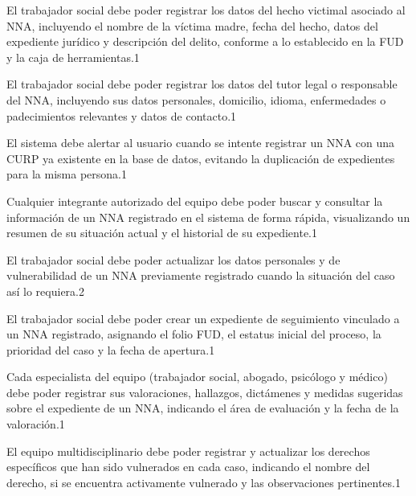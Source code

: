 \begin{requerimientosU}
	{El trabajador social debe poder registrar los datos del hecho 
		victimal asociado al NNA, incluyendo el nombre de la víctima madre, 
		fecha del hecho, datos del expediente jurídico y descripción del 
		delito, conforme a lo establecido en la FUD y la caja de 
		herramientas.}{1}{\DONE}
	
	{El trabajador social debe poder registrar los datos del tutor legal 
		o responsable del NNA, incluyendo sus datos personales, domicilio, 
		idioma, enfermedades o padecimientos relevantes y datos de 
		contacto.}{1}{\DONE}
	
	{El sistema debe alertar al usuario cuando se intente registrar un 
		NNA con una CURP ya existente en la base de datos, evitando la 
		duplicación de expedientes para la misma persona.}{1}{\DONE}
	
	{Cualquier integrante autorizado del equipo debe poder buscar y 
		consultar la información de un NNA registrado en el sistema de 
		forma rápida, visualizando un resumen de su situación actual y el 
		historial de su expediente.}{1}{\DONE}
	
	{El trabajador social debe poder actualizar los datos personales y 
		de vulnerabilidad de un NNA previamente registrado cuando la 
		situación del caso así lo requiera.}{2}{\DONE}
	
	{El trabajador social debe poder crear un expediente de seguimiento 
		vinculado a un NNA registrado, asignando el folio FUD, el estatus 
		inicial del proceso, la prioridad del caso y la fecha de 
		apertura.}{1}{\DONE}
	
	{Cada especialista del equipo (trabajador social, abogado, psicólogo 
		y médico) debe poder registrar sus valoraciones, hallazgos, 
		dictámenes y medidas sugeridas sobre el expediente de un NNA, 
		indicando el área de evaluación y la fecha de la valoración.}{1}{\DONE}
	
	{El equipo multidisciplinario debe poder registrar y actualizar los 
		derechos específicos que han sido vulnerados en cada caso, indicando 
		el nombre del derecho, si se encuentra activamente vulnerado y las 
		observaciones pertinentes.}{1}{\DONE}
	

\end{requerimientosU}
